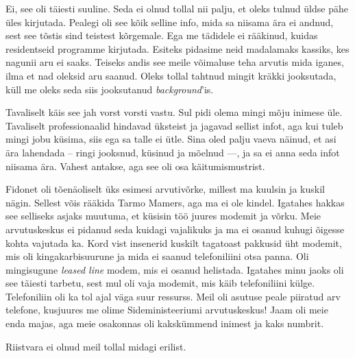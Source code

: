 
Ei, see oli täiesti suuline. Seda ei olnud tollal nii palju, et oleks tulnud üldse pähe üles 
kirjutada. Pealegi oli see kõik selline info, mida sa niisama ära ei 
andnud, sest see tõstis sind teistest kõrgemale. Ega me 
tädidele ei rääkinud, kuidas residentseid programme kirjutada. Esiteks
pidasime neid madalamaks kassiks, kes nagunii aru ei saaks. Teiseks andis see 
meile võimaluse teha arvutis mida iganes, ilma et nad oleksid aru
saanud. Oleks tollal tahtnud mingit kräkki jooksutada, küll me oleks seda siis
jooksutanud \emph{background}'is.


Tavaliselt käis see jah vorst vorsti vastu. Sul pidi olema mingi mõju 
inimese üle. Tavaliselt professionaalid hindavad üksteist ja jagavad sellist 
infot, aga kui tuleb mingi jobu küsima, siis ega sa talle ei ütle. Sina oled palju 
vaeva näinud, et asi ära lahendada -- ringi jooksnud, küsinud ja mõelnud ---, ja 
sa ei anna seda infot niisama ära. Vahest antakse, aga see oli osa 
käitumismustrist. 

Fidonet oli tõenäoliselt üks esimesi arvutivõrke, millest ma kuulsin ja kuskil 
nägin. Sellest võis rääkida Tarmo Mamers, aga ma ei ole kindel. Igatahes hakkas see selliseks asjaks muutuma, et 
küsisin töö juures modemit ja võrku. Meie 
arvutuskeskus ei pidanud seda kuidagi vajalikuks ja ma ei osanud kuhugi 
õigesse kohta vajutada ka. Kord vist insenerid kuskilt tagatoast 
pakkusid üht modemit, mis oli kingakarbisuurune ja mida ei saanud telefoniliini otsa panna. Oli mingisugune 
\emph{leased line} modem, mis ei osanud helistada. Igatahes 
minu jaoks oli see täiesti tarbetu, sest mul oli vaja modemit, mis käib 
telefoniliini külge. Telefoniliin oli ka tol ajal väga suur ressurss. Meil oli 
asutuse peale piiratud arv telefone, kusjuures me olime Sideministeeriumi 
arvutuskeskus! Jaam oli meie enda majas, aga meie osakonnas oli kakskümmend 
inimest ja kaks numbrit. 


Riistvara ei olnud meil tollal midagi erilist.



